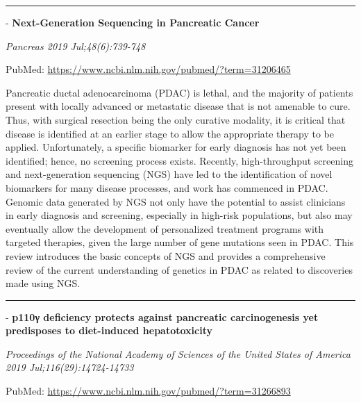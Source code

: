 \documentclass[]{article}
\begin{document}
\begin{center}\rule{0.5\linewidth}{\linethickness}\end{center}

 - \textbf{Next-Generation Sequencing in Pancreatic Cancer}

\emph{Pancreas 2019 Jul;48(6):739-748}

PubMed: \url{https://www.ncbi.nlm.nih.gov/pubmed/?term=31206465}

Pancreatic ductal adenocarcinoma (PDAC) is lethal, and the majority of
patients present with locally advanced or metastatic disease that is not
amenable to cure. Thus, with surgical resection being the only curative
modality, it is critical that disease is identified at an earlier stage
to allow the appropriate therapy to be applied. Unfortunately, a
specific biomarker for early diagnosis has not yet been identified;
hence, no screening process exists. Recently, high-throughput screening
and next-generation sequencing (NGS) have led to the identification of
novel biomarkers for many disease processes, and work has commenced in
PDAC. Genomic data generated by NGS not only have the potential to
assist clinicians in early diagnosis and screening, especially in
high-risk populations, but also may eventually allow the development of
personalized treatment programs with targeted therapies, given the large
number of gene mutations seen in PDAC. This review introduces the basic
concepts of NGS and provides a comprehensive review of the current
understanding of genetics in PDAC as related to discoveries made using
NGS.

{}

{}

\begin{center}\rule{0.5\linewidth}{\linethickness}\end{center}

 - \textbf{p110γ deficiency protects against pancreatic carcinogenesis
yet predisposes to diet-induced hepatotoxicity}

\emph{Proceedings of the National Academy of Sciences of the United
States of America 2019 Jul;116(29):14724-14733}

PubMed: \url{https://www.ncbi.nlm.nih.gov/pubmed/?term=31266893}
\end{document}
